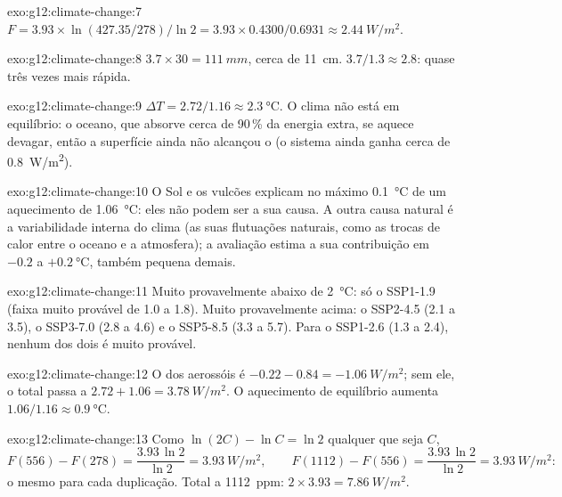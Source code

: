 \begin{solution}{exo:g12:climate-change:7}
$F = 3.93 \times \ln(427.35/278)/\ln 2 = 3.93 \times 0.4300/0.6931 \approx
\qty{2.44}{W/m^2}$.
\end{solution}

\begin{solution}{exo:g12:climate-change:8}
$3.7 \times 30 = \qty{111}{mm}$, cerca de \qty{11}{cm}. $3.7/1.3 \approx 2.8$:
quase três vezes mais rápida.
\end{solution}

\begin{solution}{exo:g12:climate-change:9}
$\Delta T = 2.72/1.16 \approx \qty{2.3}{\degreeCelsius}$. O clima não está
em equilíbrio: o oceano, que absorve cerca de 90\,\% da energia extra, se
aquece devagar, então a superfície ainda não alcançou o  (o
sistema ainda ganha cerca de \qty{0.8}{W/m^2}).
\end{solution}

\begin{solution}{exo:g12:climate-change:10}
O Sol e os vulcões explicam no máximo \qty{0.1}{\degreeCelsius} de um
aquecimento de \qty{1.06}{\degreeCelsius}: eles não podem ser a sua causa.
A outra causa natural é a variabilidade interna do clima (as suas
flutuações naturais, como as trocas de calor entre o oceano e a atmosfera);
a avaliação estima a sua contribuição em $-0.2$ a $+\qty{0.2}{\degreeCelsius}$,
também pequena demais.
\end{solution}

\begin{solution}{exo:g12:climate-change:11}
Muito provavelmente abaixo de \qty{2}{\degreeCelsius}: só o SSP1-1.9 (faixa
muito provável de 1.0 a 1.8). Muito provavelmente acima: o SSP2-4.5 (2.1 a
3.5), o SSP3-7.0 (2.8 a 4.6) e o SSP5-8.5 (3.3 a 5.7). Para o SSP1-2.6 (1.3
a 2.4), nenhum dos dois é muito provável.
\end{solution}

\begin{solution}{exo:g12:climate-change:12}
O  dos aerossóis é $-0.22 - 0.84 = \qty{-1.06}{W/m^2}$; sem ele, o
total passa a $2.72 + 1.06 = \qty{3.78}{W/m^2}$. O aquecimento de equilíbrio
aumenta $1.06/1.16 \approx \qty{0.9}{\degreeCelsius}$.
\end{solution}

\begin{solution}{exo:g12:climate-change:13}
Como $\ln(2C) - \ln C = \ln 2$ qualquer que seja $C$,
\[
  F(556) - F(278) = \frac{3.93\,\ln 2}{\ln 2} = \qty{3.93}{W/m^2}, \qquad
  F(1112) - F(556) = \frac{3.93\,\ln 2}{\ln 2} = \qty{3.93}{W/m^2}:
\]
o mesmo  para cada duplicação. Total a \qty{1112}{ppm}: $2 \times 3.93 =
\qty{7.86}{W/m^2}$.
\end{solution}

